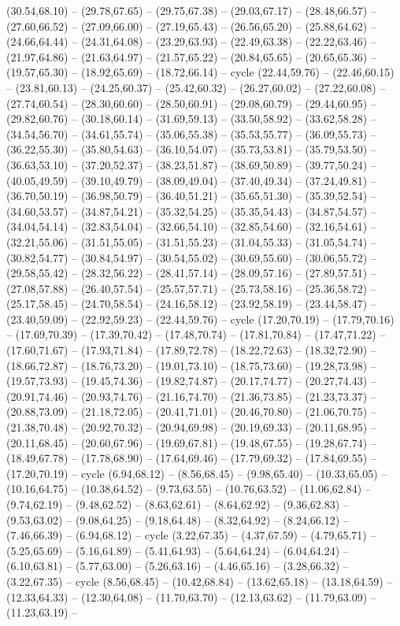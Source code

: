 {(30.54,68.10) -- (29.78,67.65) -- (29.75,67.38) -- (29.03,67.17) -- (28.48,66.57) -- (27.60,66.52) -- (27.09,66.00) -- (27.19,65.43) -- (26.56,65.20) -- (25.88,64.62) -- (24.66,64.44) -- (24.31,64.08) -- (23.29,63.93) -- (22.49,63.38) -- (22.22,63.46) -- (21.97,64.86) -- (21.63,64.97) -- (21.57,65.22) -- (20.84,65.65) -- (20.65,65.36) -- (19.57,65.30) -- (18.92,65.69) -- (18.72,66.14) -- cycle (22.44,59.76) -- (22.46,60.15) -- (23.81,60.13) -- (24.25,60.37) -- (25.42,60.32) -- (26.27,60.02) -- (27.22,60.08) -- (27.74,60.54) -- (28.30,60.60) -- (28.50,60.91) -- (29.08,60.79) -- (29.44,60.95) -- (29.82,60.76) -- (30.18,60.14) -- (31.69,59.13) -- (33.50,58.92) -- (33.62,58.28) -- (34.54,56.70) -- (34.61,55.74) -- (35.06,55.38) -- (35.53,55.77) -- (36.09,55.73) -- (36.22,55.30) -- (35.80,54.63) -- (36.10,54.07) -- (35.73,53.81) -- (35.79,53.50) -- (36.63,53.10) -- (37.20,52.37) -- (38.23,51.87) -- (38.69,50.89) -- (39.77,50.24) -- (40.05,49.59) -- (39.10,49.79) -- (38.09,49.04) -- (37.40,49.34) -- (37.24,49.81) -- (36.70,50.19) -- (36.98,50.79) -- (36.40,51.21) -- (35.65,51.30) -- (35.39,52.54) -- (34.60,53.57) -- (34.87,54.21) -- (35.32,54.25) -- (35.35,54.43) -- (34.87,54.57) -- (34.04,54.14) -- (32.83,54.04) -- (32.66,54.10) -- (32.85,54.60) -- (32.16,54.61) -- (32.21,55.06) -- (31.51,55.05) -- (31.51,55.23) -- (31.04,55.33) -- (31.05,54.74) -- (30.82,54.77) -- (30.84,54.97) -- (30.54,55.02) -- (30.69,55.60) -- (30.06,55.72) -- (29.58,55.42) -- (28.32,56.22) -- (28.41,57.14) -- (28.09,57.16) -- (27.89,57.51) -- (27.08,57.88) -- (26.40,57.54) -- (25.57,57.71) -- (25.73,58.16) -- (25.36,58.72) -- (25.17,58.45) -- (24.70,58.54) -- (24.16,58.12) -- (23.92,58.19) -- (23.44,58.47) -- (23.40,59.09) -- (22.92,59.23) -- (22.44,59.76) -- cycle (17.20,70.19) -- (17.79,70.16) -- (17.69,70.39) -- (17.39,70.42) -- (17.48,70.74) -- (17.81,70.84) -- (17.47,71.22) -- (17.60,71.67) -- (17.93,71.84) -- (17.89,72.78) -- (18.22,72.63) -- (18.32,72.90) -- (18.66,72.87) -- (18.76,73.20) -- (19.01,73.10) -- (18.75,73.60) -- (19.28,73.98) -- (19.57,73.93) -- (19.45,74.36) -- (19.82,74.87) -- (20.17,74.77) -- (20.27,74.43) -- (20.91,74.46) -- (20.93,74.76) -- (21.16,74.70) -- (21.36,73.85) -- (21.23,73.37) -- (20.88,73.09) -- (21.18,72.05) -- (20.41,71.01) -- (20.46,70.80) -- (21.06,70.75) -- (21.38,70.48) -- (20.92,70.32) -- (20.94,69.98) -- (20.19,69.33) -- (20.11,68.95) -- (20.11,68.45) -- (20.60,67.96) -- (19.69,67.81) -- (19.48,67.55) -- (19.28,67.74) -- (18.49,67.78) -- (17.78,68.90) -- (17.64,69.46) -- (17.79,69.32) -- (17.84,69.55) -- (17.20,70.19) -- cycle (6.94,68.12) -- (8.56,68.45) -- (9.98,65.40) -- (10.33,65.05) -- (10.16,64.75) -- (10.38,64.52) -- (9.73,63.55) -- (10.76,63.52) -- (11.06,62.84) -- (9.74,62.19) -- (9.48,62.52) -- (8.63,62.61) -- (8.64,62.92) -- (9.36,62.83) -- (9.53,63.02) -- (9.08,64.25) -- (9.18,64.48) -- (8.32,64.92) -- (8.24,66.12) -- (7.46,66.39) -- (6.94,68.12) -- cycle (3.22,67.35) -- (4.37,67.59) -- (4.79,65.71) -- (5.25,65.69) -- (5.16,64.89) -- (5.41,64.93) -- (5.64,64.24) -- (6.04,64.24) -- (6.10,63.81) -- (5.77,63.00) -- (5.26,63.16) -- (4.46,65.16) -- (3.28,66.32) -- (3.22,67.35) -- cycle (8.56,68.45) -- (10.42,68.84) -- (13.62,65.18) -- (13.18,64.59) -- (12.33,64.33) -- (12.30,64.08) -- (11.70,63.70) -- (12.13,63.62) -- (11.79,63.09) -- (11.23,63.19) -- }
